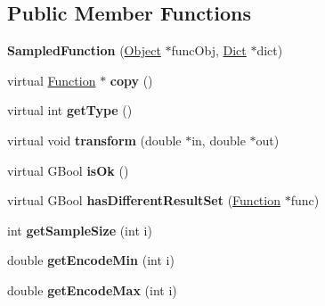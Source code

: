 \subsection*{Public Member Functions}
\begin{DoxyCompactItemize}
\item 
\mbox{\label{class_sampled_function_a1089869de9728f05e0bf0673532d8a5a}} 
{\bfseries Sampled\+Function} (\hyperlink{class_object}{Object} $\ast$func\+Obj, \hyperlink{class_dict}{Dict} $\ast$dict)
\item 
\mbox{\label{class_sampled_function_ad2184da0ae6511fe6a3aab543908a371}} 
virtual \hyperlink{class_function}{Function} $\ast$ {\bfseries copy} ()
\item 
\mbox{\label{class_sampled_function_a8f857af4898fe96f621de4c20bdc4680}} 
virtual int {\bfseries get\+Type} ()
\item 
\mbox{\label{class_sampled_function_a3c73865ff5c803969f4c320bfadcbd30}} 
virtual void {\bfseries transform} (double $\ast$in, double $\ast$out)
\item 
\mbox{\label{class_sampled_function_a7afd1ddf1c397a1702bbfeed9e0195ce}} 
virtual G\+Bool {\bfseries is\+Ok} ()
\item 
\mbox{\label{class_sampled_function_a54fe686aa38d24ae12b24b55ac911ff8}} 
virtual G\+Bool {\bfseries has\+Different\+Result\+Set} (\hyperlink{class_function}{Function} $\ast$func)
\item 
\mbox{\label{class_sampled_function_a3629ec0250a943ac803999489cb30e54}} 
int {\bfseries get\+Sample\+Size} (int i)
\item 
\mbox{\label{class_sampled_function_a4f0422df3be738c00523836ba0d28234}} 
double {\bfseries get\+Encode\+Min} (int i)
\item 
\mbox{\label{class_sampled_function_ad351ce404c2465e918de5e6fbe513181}} 
double {\bfseries get\+Encode\+Max} (int i)
\item 
\mbox{\label{class_sampled_function_a70db34027887d70d295624be835c3859}} 

\end{DoxyCompactItemize}
